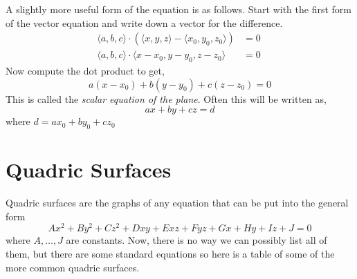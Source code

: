 \documentclass[10pt,reqno]{book}
\theoremstyle{definition}
\begin{document}
	A slightly more useful form of the equation is as follows. Start with the first form of the vector equation and write down a vector for the difference.
	\begin{align*}
		\langle a,b,c \rangle \cdot \left( \langle x,y,z \rangle - \langle x_0,y_0,z_0 \rangle \right) &= 0\\
		\langle a,b,c \rangle \cdot \langle x-x_0,y-y_0,z-z_0 \rangle &= 0\
	\end{align*}
	Now compute the dot product to get,
	\[ a(x-x_0) + b(y-y_0) + c(z-z_0) = 0 \]
	This is called the \textit{scalar equation of the plane}. Often this will be written as,
	\[ ax + by + cz = d \]
	where $d=ax_0 + by_0 + cz_0$

	\section{Quadric Surfaces}

	Quadric surfaces are the graphs of any equation that can be put into the general form
	\[ Ax^2 + By^2 + Cz^2 + Dxy + Exz + Fyz + Gx + Hy + Iz + J = 0 \]
	where $A,\ldots,J$ are constants. Now, there is no way we can possibly list all of them, but there are some standard equations so here is a table of some of the more common quadric surfaces.\\ \\
	
\end{document}
